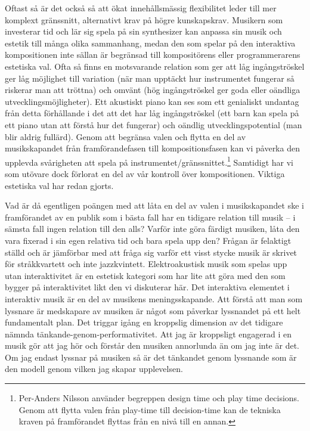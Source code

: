 \documentclass[12pt]{article}
\begin{document}
Oftast så är det också så att ökat innehållsmässig flexibilitet leder till mer komplext gränssnitt, alternativt krav på högre kunskapskrav. Musikern som investerar tid och lär sig spela på sin synthesizer kan anpassa sin musik och estetik till många olika sammanhang, medan den som spelar på den interaktiva kompositionen inte sällan är begränsad till kompositörens eller programmerarens estetiska val. Ofta så finns en motsvarande relation som ger att låg ingångströskel ger låg möjlighet till variation (när man upptäckt hur instrumentet fungerar så riskerar man att tröttna) och omvänt (hög ingångströskel ger goda eller oändliga utvecklingsmöjligheter). Ett akustiskt piano kan ses som ett genialiskt undantag från detta förhållande i det att det har låg ingångströskel (ett barn kan spela på ett piano utan att förstå hur det fungerar) och oändlig utvecklingspotential (man blir aldrig fullärd). Genom att begränsa valen och flytta en del av musikskapandet från framförandefasen till kompositionsfasen kan vi påverka den upplevda svårigheten att spela på instrumentet/gränssnittet.\footnote{Per-Anders Nilsson använder begreppen design time och play time decisions. Genom att flytta valen från play-time till decision-time kan de tekniska kraven på framförandet flyttas från en nivå till en annan.} Samtidigt har vi som utövare dock förlorat en del av vår kontroll över kompositionen. Viktiga estetiska val har redan gjorts. 

Vad är då egentligen poängen med att låta en del av valen i musikskapandet ske i framförandet av en publik som i bästa fall har en tidigare relation till musik -- i sämsta fall ingen relation till den alls? Varför inte göra färdigt musiken, låta den vara fixerad i sin egen relativa tid och bara spela upp den? Frågan är felaktigt ställd och är jämförbar med att fråga sig varför ett visst stycke musik är skrivet för stråkkvartett och inte jazzkvintett. Elektroakustisk musik som spelas upp utan interaktivitet är en estetisk kategori som har lite att göra med den som bygger på interaktivitet likt den vi diskuterar här. Det interaktiva elementet i interaktiv musik är en del av musikens meningsskapande. Att förstå att man som lyssnare är medskapare av musiken är något som påverkar lyssnandet på ett helt fundamentalt plan. Det triggar igång en kroppslig dimension av det tidigare nämnda tänkande-genom-performativitet. Att jag är kroppsligt engagerad i en musik gör att jag hör och förstår den musiken annorlunda än om jag inte är det. Om jag endast lyssnar på musiken så är det tänkandet genom lyssnande som är den modell genom vilken jag skapar upplevelsen.
\end{document}
